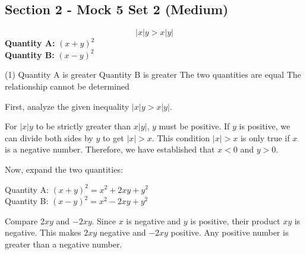 \documentclass[11pt,paper=a4,answers]{exam}
\begin{document}
\begin{questions}
\pointsinrightmargin
\pointsdroppedatright
\marksnotpoints
{}
\pointformat{\boldmath\themarginpoints}
\bracketedpoints

\section*{Section 2 - Mock 5 Set 2 (Medium)}


\question
\[ |x|y > x|y| \]
\vspace{5pt}
\textbf{Quantity A: } $(x + y)^2$ \\
\vspace{5pt}
\textbf{Quantity B: } $(x - y)^2$

\begin{tasks}(1)
\task[A)] Quantity A is greater
\task[B)] Quantity B is greater
\task[C)] The two quantities are equal
\task[D)] The relationship cannot be determined
\end{tasks}

\begin{solution}
First, analyze the given inequality $|x|y > x|y|$. 
\vspace{5pt}
\begin{center}
For $|x|y$ to be strictly greater than $x|y|$, $y$ must be positive. 
\vspace{5pt}
If $y$ is positive, we can divide both sides by $y$ to get $|x| > x$. 
\vspace{5pt}
This condition $|x| > x$ is only true if $x$ is a negative number. 
\vspace{5pt}
Therefore, we have established that $x < 0$ and $y > 0$.
\end{center}
\vspace{5pt}
Now, expand the two quantities:
\vspace{5pt}
\begin{center}
Quantity A: $(x + y)^2 = x^2 + 2xy + y^2$ \\
\vspace{5pt}
Quantity B: $(x - y)^2 = x^2 - 2xy + y^2$
\end{center}
\vspace{5pt}
Compare $2xy$ and $-2xy$. Since $x$ is negative and $y$ is positive, their product $xy$ is negative.
\vspace{5pt}
This makes $2xy$ negative and $-2xy$ positive. Any positive number is greater than a negative number.


\end{solution}
\end{questions}
\end{document}
